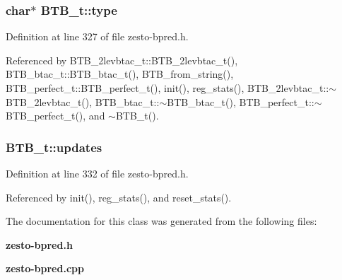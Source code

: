 \subsubsection[{type}]{\setlength{\rightskip}{0pt plus 5cm}char$\ast$ {\bf BTB\_\-t::type}\hspace{0.3cm}{\tt  [protected]}}\label{classBTB__t_e991fcedc1dbf7ebaa71aedc085c144f}




Definition at line 327 of file zesto-bpred.h.

Referenced by BTB\_\-2levbtac\_\-t::BTB\_\-2levbtac\_\-t(), BTB\_\-btac\_\-t::BTB\_\-btac\_\-t(), BTB\_\-from\_\-string(), BTB\_\-perfect\_\-t::BTB\_\-perfect\_\-t(), init(), reg\_\-stats(), BTB\_\-2levbtac\_\-t::$\sim$BTB\_\-2levbtac\_\-t(), BTB\_\-btac\_\-t::$\sim$BTB\_\-btac\_\-t(), BTB\_\-perfect\_\-t::$\sim$BTB\_\-perfect\_\-t(), and $\sim$BTB\_\-t().
\subsubsection[{updates}]{ {\bf BTB\_\-t::updates}\hspace{0.3cm}{\tt  [protected]}}\label{classBTB__t_8faf4c07e18f7b0a848c36516b1b1d51}




Definition at line 332 of file zesto-bpred.h.

Referenced by init(), reg\_\-stats(), and reset\_\-stats().

The documentation for this class was generated from the following files:\begin{CompactItemize}
\item 
{\bf zesto-bpred.h}\item 
{\bf zesto-bpred.cpp}\end{CompactItemize}
